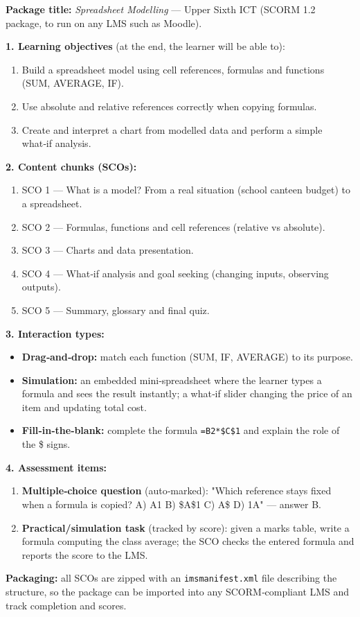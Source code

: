 \documentclass[11pt]{article}
\begin{document}
\begin{corrige}
\textbf{Package title:} \emph{Spreadsheet Modelling} — Upper Sixth ICT (SCORM 1.2 package, to run on any LMS such as Moodle).

\textbf{1. Learning objectives} (at the end, the learner will be able to):
\begin{enumerate}
\item Build a spreadsheet model using cell references, formulas and functions (SUM, AVERAGE, IF).
\item Use absolute and relative references correctly when copying formulas.
\item Create and interpret a chart from modelled data and perform a simple what‑if analysis.
\end{enumerate}

\textbf{2. Content chunks (SCOs):}
\begin{enumerate}
\item SCO 1 — What is a model? From a real situation (school canteen budget) to a spreadsheet.
\item SCO 2 — Formulas, functions and cell references (relative vs absolute).
\item SCO 3 — Charts and data presentation.
\item SCO 4 — What‑if analysis and goal seeking (changing inputs, observing outputs).
\item SCO 5 — Summary, glossary and final quiz.
\end{enumerate}

\textbf{3. Interaction types:}
\begin{itemize}
\item \textbf{Drag‑and‑drop:} match each function (SUM, IF, AVERAGE) to its purpose.
\item \textbf{Simulation:} an embedded mini‑spreadsheet where the learner types a formula and sees the result instantly; a what‑if slider changing the price of an item and updating total cost.
\item \textbf{Fill‑in‑the‑blank:} complete the formula \texttt{=B2*\$C\$1} and explain the role of the \$ signs.
\end{itemize}

\textbf{4. Assessment items:}
\begin{enumerate}
\item \textbf{Multiple‑choice question} (auto‑marked): "Which reference stays fixed when a formula is copied? A) A1  B) \$A\$1  C) A\$  D) 1A" — answer B.
\item \textbf{Practical/simulation task} (tracked by score): given a marks table, write a formula computing the class average; the SCO checks the entered formula and reports the score to the LMS.
\end{enumerate}

\textbf{Packaging:} all SCOs are zipped with an \texttt{imsmanifest.xml} file describing the structure, so the package can be imported into any SCORM‑compliant LMS and track completion and scores.
\end{corrige}
\end{document}
